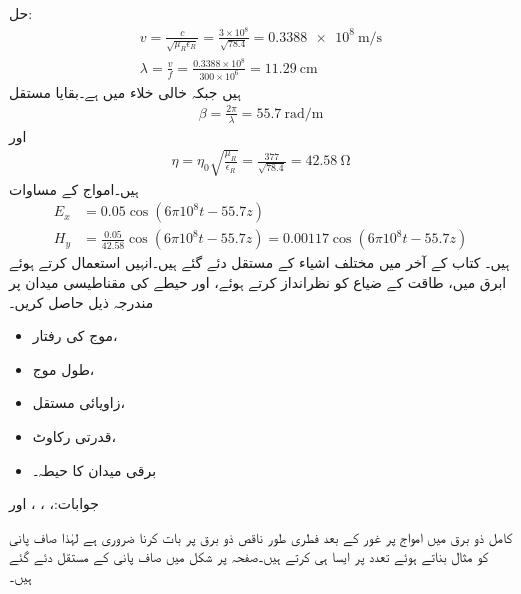 حل:
\begin{align*}
v=\frac{c}{\sqrt{\mu_R \epsilon_R}}=\frac{3 \times 10^8}{\sqrt{78.4}}=\SI{0.3388e8}{\meter \per \second}\\
\lambda=\frac{v}{f}=\frac{0.3388 \times 10^8}{300 \times 10^6}=\SI{11.29}{\centi\meter}
\end{align*}
ہیں جبکہ خالی خلاء میں  ہے۔بقایا مستقل
\begin{align*}
\beta=\frac{2\pi}{\lambda}=\SI{55.7}{\radian \per \meter}
\end{align*}
اور
\begin{align*}
\eta=\eta_0 \sqrt{\frac{\mu_R}{\epsilon_R}}=\frac{377}{\sqrt{78.4}}=\SI{42.58}{\ohm}
\end{align*}
ہیں۔امواج کے مساوات
\begin{align*}
E_x&=0.05 \cos (6\pi 10^8 t -55.7 z)\\
H_y&=\frac{0.05}{42.58} \cos (6\pi 10^8 t -55.7 z)=0.00117 \cos (6\pi 10^8 t -55.7 z)
\end{align*}
ہیں۔
کتاب کے آخر میں مختلف اشیاء کے مستقل دئے گئے ہیں۔انہیں استعمال کرتے ہوئے  ابرق میں، طاقت کے ضیاع کو نظرانداز کرتے ہوئے،   اور  حیطے  کی مقناطیسی میدان پر مندرجہ ذیل حاصل کریں۔
\begin{itemize}
\item
موج کی رفتار،
\item
طول موج،
\item
زاویائی مستقل،
\item
قدرتی رکاوٹ،
\item
برقی میدان کا حیطہ۔
\end{itemize} 

جوابات:، ، ،  اور 

کامل ذو برق میں امواج پر غور کے بعد فطری طور ناقص ذو برق پر بات کرنا ضروری ہے لہٰذا صاف پانی کو مثال بناتے ہوئے    تعدد پر  ایسا ہی کرتے ہیں۔صفحہ  پر شکل  میں صاف پانی کے مستقل دئے گئے ہیں۔

